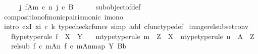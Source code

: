 \begin{isabellebody}
\ \ \isamarkupfalse%
\ \isamarkupfalse%
\ {\isachardoublequoteopen}{\isasymexists}j{\isachardot}{\kern0pt}\ {\isacharparenleft}{\kern0pt}f{\isasymlparr}A{\isasymrparr}\isactrlbsub m\ {\isasymcirc}\isactrlsub c\ n\isactrlesub {\isacharcomma}{\kern0pt}\ j{\isacharparenright}{\kern0pt}\ {\isasymsubseteq}\isactrlsub c\ B{\isachardoublequoteclose}\isanewline
\ \ \ \ \isamarkupfalse%
\ subobject{\isacharunderscore}{\kern0pt}of{\isacharunderscore}{\kern0pt}def\ \isamarkupfalse%
\ composition{\isacharunderscore}{\kern0pt}of{\isacharunderscore}{\kern0pt}monic{\isacharunderscore}{\kern0pt}pair{\isacharunderscore}{\kern0pt}is{\isacharunderscore}{\kern0pt}monic\ i{\isacharunderscore}{\kern0pt}mono\isanewline
\ \ \ \ \isamarkupfalse%
\ {\isacharparenleft}{\kern0pt}intro\ exI{\isacharbrackleft}{\kern0pt}\ x{\isacharequal}{\kern0pt}{\isachardoublequoteopen}i\ {\isasymcirc}\isactrlsub c\ k{\isachardoublequoteclose}{\isacharbrackright}{\kern0pt}{\isacharcomma}{\kern0pt}\ typecheck{\isacharunderscore}{\kern0pt}cfuncs{\isacharcomma}{\kern0pt}\ simp\ add{\isacharcolon}{\kern0pt}\ cfunc{\isacharunderscore}{\kern0pt}type{\isacharunderscore}{\kern0pt}def{\isacharparenright}{\kern0pt}\isanewline
{}\isamarkupfalse%
%
\endisatagproof
{\isafoldproof}%
%
\isadelimproof
\isanewline
%
\endisadelimproof
\isanewline
{}\isamarkupfalse%
\ image{\isacharunderscore}{\kern0pt}rel{\isacharunderscore}{\kern0pt}subset{\isacharunderscore}{\kern0pt}conv{\isacharcolon}{\kern0pt}\isanewline
\ \ \ f{\isacharunderscore}{\kern0pt}type{\isacharbrackleft}{\kern0pt}type{\isacharunderscore}{\kern0pt}rule{\isacharbrackright}{\kern0pt}{\isacharcolon}{\kern0pt}\ {\isachardoublequoteopen}f\ {\isacharcolon}{\kern0pt}\ X\ {\isasymrightarrow}\ Y{\isachardoublequoteclose}\isanewline
\ \ \ m{\isacharunderscore}{\kern0pt}type{\isacharbrackleft}{\kern0pt}type{\isacharunderscore}{\kern0pt}rule{\isacharbrackright}{\kern0pt}{\isacharcolon}{\kern0pt}\ {\isachardoublequoteopen}m\ {\isacharcolon}{\kern0pt}\ Z\ {\isasymrightarrow}\ X{\isachardoublequoteclose}\ \ n{\isacharunderscore}{\kern0pt}type{\isacharbrackleft}{\kern0pt}type{\isacharunderscore}{\kern0pt}rule{\isacharbrackright}{\kern0pt}{\isacharcolon}{\kern0pt}\ {\isachardoublequoteopen}n\ {\isacharcolon}{\kern0pt}\ A\ {\isasymrightarrow}\ Z{\isachardoublequoteclose}\isanewline
\ \ \ rel{\isacharunderscore}{\kern0pt}sub{}{\isacharcolon}{\kern0pt}\ {\isachardoublequoteopen}{\isacharparenleft}{\kern0pt}{\isacharparenleft}{\kern0pt}f\ {\isasymcirc}\isactrlsub c\ m{\isacharparenright}{\kern0pt}{\isasymlparr}A{\isasymrparr}\isactrlbsub n\isactrlesub {\isacharcomma}{\kern0pt}\ {\isacharbrackleft}{\kern0pt}{\isacharparenleft}{\kern0pt}f\ {\isasymcirc}\isactrlsub c\ m{\isacharparenright}{\kern0pt}{\isasymlparr}A{\isasymrparr}\isactrlbsub n\isactrlesub {\isacharbrackright}{\kern0pt}map{\isacharparenright}{\kern0pt}\ {\isasymsubseteq}\isactrlbsub Y\isactrlesub \ {\isacharparenleft}{\kern0pt}B{\isacharcomma}{\kern0pt}b{\isacharparenright}{\kern0pt}{\isachardoublequoteclose}\isanewline

\end{isabellebody}
